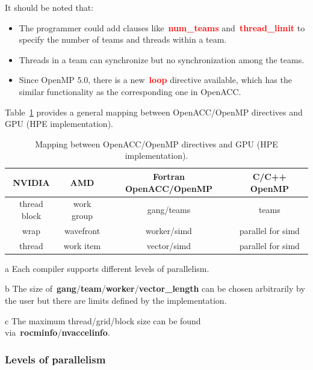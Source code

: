 \par
It should be noted that:
\begin{itemize}
    \item The programmer could add clauses like~\textbf{\textcolor{red}{num\_teams}} and~\textbf{\textcolor{red}{thread\_limit}} to specify the number of teams and threads within a team.
    \item Threads in a team can synchronize but no synchronization among the teams.
    \item Since OpenMP 5.0, there is a new~\textbf{\textcolor{red}{loop}} directive available, which has the similar functionality as the corresponding one in OpenACC.
\end{itemize}


\par
Table~\ref{tbl:openacc_openmp_directive} provides a general mapping between OpenACC/OpenMP directives and GPU (HPE implementation).


\begin{table}
\centering\caption{Mapping between OpenACC/OpenMP directives and GPU (HPE implementation).}\label{tbl:openacc_openmp_directive}
\begin{tabular}{ |c|c|c|c| } 
\hline
\textbf{NVIDIA} & \textbf{AMD} & \textbf{Fortran OpenACC/OpenMP} & \textbf{C/C++ OpenMP} \\
\hline
thread block & work group & gang/teams & teams \\ 
wrap & wavefront & worker/simd & parallel for simd \\
thread & work item & vector/simd & parallel for simd\\
\hline
\end{tabular}
\begin{tablenotes}
\footnotesize
    \item[a] Each compiler supports different levels of parallelism.
    \item[b] The size of~\textbf{gang}/\textbf{team}/\textbf{worker}/\textbf{vector\_length} can be chosen arbitrarily by the user but there are limits defined by the implementation.
    \item[c] The maximum thread/grid/block size can be found via~\textbf{rocminfo}/\textbf{nvaccelinfo}.
\end{tablenotes}
\end{table}


\subsubsection{Levels of parallelism}


